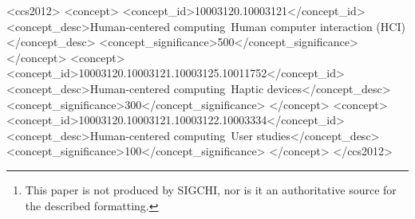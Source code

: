\documentclass[preprint]{../latex/sigchi-modern}
\begin{document}

\maketitle

\begin{abstract}
This paper describes the formatting requirements for SIGCHI Conference
Proceedings and a few recommendations on writing for the worldwide SIGCHI
readership. It is also the documentation for the \texttt{sigchi-modern}
\LaTeX\ class for producing formatted papers.\footnote{This paper is not
produced by SIGCHI, nor is it an authoritative source for the described
formatting.}
\end{abstract}


\begin{CCSXML}
  <ccs2012>
  <concept>
  <concept_id>10003120.10003121</concept_id>
  <concept_desc>Human-centered computing~Human computer interaction (HCI)</concept_desc>
  <concept_significance>500</concept_significance>
  </concept>
  <concept>
  <concept_id>10003120.10003121.10003125.10011752</concept_id>
  <concept_desc>Human-centered computing~Haptic devices</concept_desc>
  <concept_significance>300</concept_significance>
  </concept>
  <concept>
  <concept_id>10003120.10003121.10003122.10003334</concept_id>
  <concept_desc>Human-centered computing~User studies</concept_desc>
  <concept_significance>100</concept_significance>
  </concept>
  </ccs2012>
\end{CCSXML}
\begin{CCS}
\end{CCS}
\end{document}
